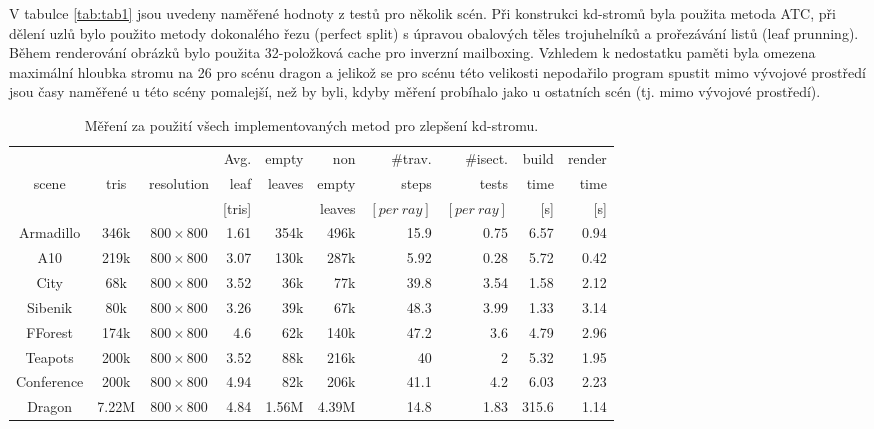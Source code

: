 \documentclass[report,11pt]{elsarticle}
\begin{document}
V tabulce \ref{tab:tab1} jsou uvedeny naměřené hodnoty z testů pro několik scén. Při konstrukci kd-stromů byla použita metoda ATC, při dělení uzlů bylo použito metody dokonalého řezu (perfect split) s úpravou obalových těles trojuhelníků a prořezávání listů (leaf prunning). Během renderování obrázků bylo použita 32-položková cache pro inverzní mailboxing. Vzhledem k nedostatku paměti byla omezena maximální hloubka stromu na 26 pro scénu dragon a jelikož se pro scénu této velikosti nepodařilo program spustit mimo vývojové prostředí jsou časy naměřené u této scény pomalejší, než by byli, kdyby měření probíhalo jako u ostatních scén (tj. mimo vývojové prostředí).\\
\begin{table}[b]\footnotesize
\begin{center}
\begin{tabular}{| c |  c | c || r | r | r || r | r | r | r |}
\hline
          &         &        & Avg. & empty &   non   & \#trav. & \#isect. &  build & render \\
scene & tris & resolution & leaf    &    leaves   & empty  & steps    &    tests   & time   & time \\
          &           &       &  [tris]  &     & leaves  & $[per~ray]$     &   $[per~ray]$   & [s]  & [s] \\
\hline
\hline
Armadillo & 346k & $800\times800$ & 	1.61 &  354k & 496k &  15.9 & 0.75 & 6.57 & 0.94 \\ \hline
A10 & 219k  & $800\times800$ & 	3.07 &  130k & 287k &  5.92 & 0.28 & 5.72 & 0.42 \\ \hline
City & 68k  & $800\times800$ & 		3.52 &  36k & 77k &  39.8 & 3.54 & 1.58 & 2.12 \\ \hline
Sibenik & 80k & $800\times800$ & 	3.26 &  39k & 67k &  48.3 & 3.99 & 1.33 & 3.14 \\ \hline
FForest & 174k & $800\times800$ &	4.6 &  62k & 140k &  47.2 & 3.6 & 4.79 & 2.96 \\ \hline
Teapots & 200k &  $800\times800$ & 	3.52 &  88k & 216k &  40 & 2 & 5.32 & 1.95 \\ \hline
Conference & 200k &  $800\times800$ & 4.94 &  82k & 206k &  41.1 & 4.2 & 6.03 & 2.23 \\ \hline
Dragon & 7.22M  & $800\times800$ & 	4.84 &  1.56M & 4.39M & 14.8 & 1.83 & 315.6 & 1.14 \\ \hline
\end{tabular}
\end{center}
\vspace*{0mm}
\caption{{\label{tab:tab1}} Měření za použití všech implementovaných metod pro zlepšení kd-stromu.}
\vspace*{0mm}
\label{shadowtable}
\end{table}
\end{document}
